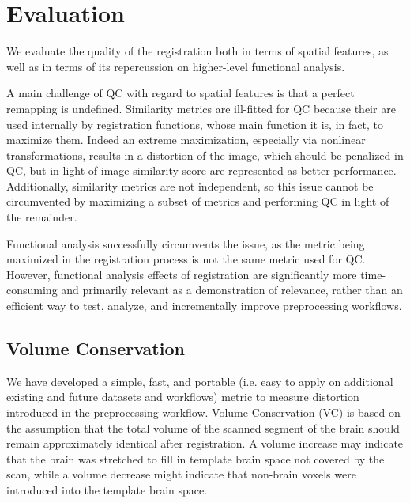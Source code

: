 \section{Evaluation}

We evaluate the quality of the registration both in terms of spatial features, as well as in terms of its repercussion on higher-level functional analysis.

A main challenge of QC with regard to spatial features is that a perfect remapping is undefined.
Similarity metrics are ill-fitted for QC because their are used internally by registration functions, whose main function it is, in fact, to maximize them.
Indeed an extreme maximization, especially via nonlinear transformations, results in a distortion of the image, which should be penalized in QC, but in light of image similarity score are represented as better performance.
Additionally, similarity metrics are not independent, so this issue cannot be circumvented by maximizing a subset of metrics and performing QC in light of the remainder.

Functional analysis successfully circumvents the issue, as the metric being maximized in the registration process is not the same metric used for QC.
However, functional analysis effects of registration are significantly more time-consuming and primarily relevant as a demonstration of relevance, rather than an efficient way to test, analyze, and incrementally improve preprocessing workflows.

\subsection{Volume Conservation}

We have developed a simple, fast, and portable (i.e. easy to apply on additional existing and future datasets and workflows) metric to measure distortion introduced in the preprocessing workflow.
Volume Conservation (VC) is based on the assumption that the total volume of the scanned segment of the brain should remain approximately identical after registration.
A volume increase may indicate that the brain was stretched to fill in template brain space not covered by the scan, while a volume decrease might indicate that non-brain voxels were introduced into the template brain space.

